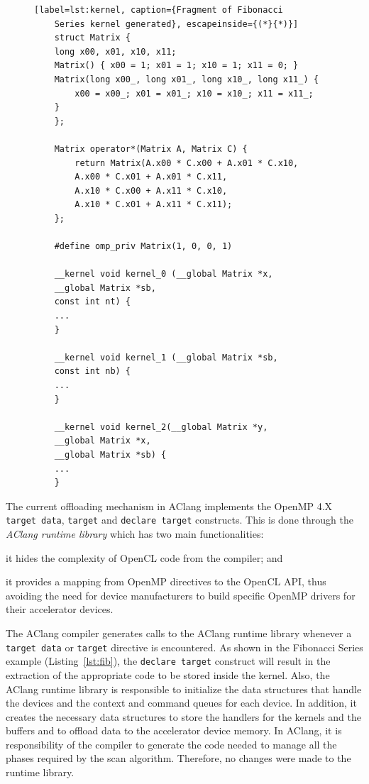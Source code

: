 \documentclass[Ingles]{ic-tese-v1}
\newcommand{\ttt}[1]{{\texttt{#1}}}
\newcommand{\rlst}[1]{Listing~\ref{lst:#1}}
\begin{document}
\begin{figure}[t]
	\lstset{basicstyle=\scriptsize}
	\begin{lstlisting}[label=lst:kernel, caption={Fragment of Fibonacci
	Series kernel generated}, escapeinside={(*}{*)}]
	struct Matrix {
	long x00, x01, x10, x11;
	Matrix() { x00 = 1; x01 = 1; x10 = 1; x11 = 0; }
	Matrix(long x00_, long x01_, long x10_, long x11_) {
		x00 = x00_; x01 = x01_; x10 = x10_; x11 = x11_;
	}
	};

	Matrix operator*(Matrix A, Matrix C) {
		return Matrix(A.x00 * C.x00 + A.x01 * C.x10,
		A.x00 * C.x01 + A.x01 * C.x11,
		A.x10 * C.x00 + A.x11 * C.x10,
		A.x10 * C.x01 + A.x11 * C.x11);
	};

	#define omp_priv Matrix(1, 0, 0, 1)

	__kernel void kernel_0 (__global Matrix *x,
	__global Matrix *sb,
	const int nt) {
	...
	}

	__kernel void kernel_1 (__global Matrix *sb,
	const int nb) {
	...
	}

	__kernel void kernel_2(__global Matrix *y,
	__global Matrix *x,
	__global Matrix *sb) {
	...
	}
	\end{lstlisting}
\end{figure}

The current offloading  mechanism in AClang implements  the OpenMP 4.X
\ttt{target data},  \ttt{target} and \ttt{declare  target} constructs. This is
done through the \textit{AClang runtime library} which  has two main functionalities:
\begin{inparaenum}[(i)\upshape]
	\item it hides the complexity of OpenCL code from the compiler; and
	\item it provides a mapping from  OpenMP directives to the OpenCL API,
	thus avoiding  the need for  device manufacturers to  build specific
	OpenMP drivers for their accelerator devices.
\end{inparaenum}

The AClang compiler generates calls to  the AClang runtime library whenever a
\ttt{target data}  or \ttt{target}  directive is encountered.   As shown  in  the Fibonacci
Series example (\rlst{fib}),  the \ttt{declare  target}
construct will result in the extraction  of the appropriate code to be
stored  inside  the  kernel.  Also,  the  AClang  runtime  library  is
responsible to initialize the data  structures that handle the devices
and the context  and command queues for each device.   In addition, it
creates the  necessary data structures  to store the handlers  for the
kernels and the buffers and to offload data to the accelerator device
memory.  In AClang, it is responsibility of the compiler to generate
the  code needed  to manage  all the  phases required by  the scan  algorithm.
Therefore, no changes were made to the runtime library.
\end{document}
